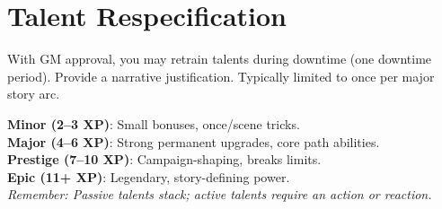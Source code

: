 \section{Talent Respecification}
\label{sec:talent-respec}
With GM approval, you may retrain talents during downtime (one downtime period). Provide a narrative justification. Typically limited to once per major story arc.

\begin{tcolorbox}[colback=purple!5!white,colframe=purple!75!black,title=\textbf{Talent Selection Quick Reference},fonttitle=\bfseries,breakable]
\textbf{Minor (2--3 XP)}: Small bonuses, once/scene tricks. \\
\textbf{Major (4--6 XP)}: Strong permanent upgrades, core path abilities. \\
\textbf{Prestige (7--10 XP)}: Campaign-shaping, breaks limits. \\
\textbf{Epic (11+ XP)}: Legendary, story-defining power. \\[2mm]
\textit{Remember: Passive talents stack; active talents require an action or reaction.}
\end{tcolorbox}